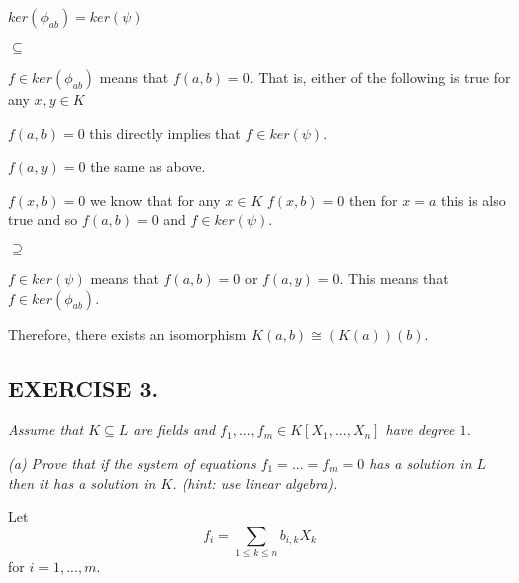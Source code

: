 \documentclass{article}
\begin{document}
$ker(\phi_{ab})=ker(\psi)$

$\subseteq$

$f\in ker(\phi_{ab})$ means that $f(a, b)=0$. That is, either of the following is true for any $x, y\in K$

\indent $f(a, b)=0$ this directly implies that $f\in ker(\psi)$.

\indent $f(a, y)=0$ the same as above.

\indent $f(x, b)=0$ we know that for any $x\in K$ $f(x, b)=0$ then for $x=a$ this is also true and so $f(a, b)=0$ and $f\in ker(\psi)$.

$\supseteq$

$f\in ker(\psi)$ means that $f(a, b)=0$ or $f(a, y)=0$. This means that $f\in ker(\phi_{ab})$.

Therefore, there exists an isomorphism $K(a, b)\cong (K(a))(b)$.

\subsection*{EXERCISE 3.}
\emph{\color{pink}Assume that $K\subseteq L$ are fields and $f_1,...,f_m\in K[X_1,...,X_n]$ have degree $1$.}

\emph{\color{pink}(a) Prove that if the system of equations $f_1=...=f_m=0$ has a solution in $L$ then it has a solution in $K$. (hint: use linear algebra).}
\smallskip

Let
$$f_i=\sum\limits_{1\leq k\leq n}b_{i, k}X_k$$
for $i=1,...,m$.




\end{document}

